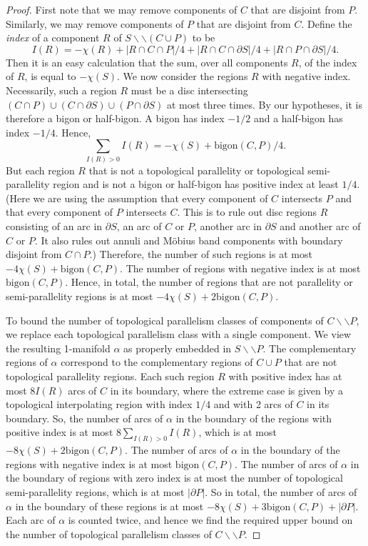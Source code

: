 \documentclass[oneside]{amsart}
\numberwithin{equation}{section}
\theoremstyle{plain}
\theoremstyle{definition}
\newcommand{\cut}{\backslash\backslash}
\begin{document}
\begin{proof}
First note that we may remove components of $C$ that are disjoint from $P$. Similarly, we may remove components of $P$ that are disjoint from $C$.
Define the \emph{index} of a component $R$ of $S \cut (C \cup P)$ to be 
$$I(R) = -\chi(R) + |R \cap C \cap P|/4 + |R \cap C \cap \partial S|/4 + |R \cap P \cap \partial S|/4.$$ 
Then it is an easy calculation that the sum, over all components $R$, of the index of $R$, is equal to $-\chi(S)$. We now consider the regions $R$ with negative index. Necessarily, such a region $R$ must be a disc intersecting $(C \cap P) \cup (C \cap \partial S) \cup (P \cap \partial S)$ at most three times. By our hypotheses, it is therefore a  bigon or half-bigon. A bigon has index $-1/2$ and a half-bigon has index $-1/4$. Hence,
$$\sum_{I(R) > 0} I(R) = - \chi(S) + \mathrm{bigon}(C,P)/4.$$
But each region $R$ that is not a topological parallelity or topological semi-parallelity region and is not a bigon or half-bigon has positive index at least $1/4$. (Here we are using the assumption that every component of $C$ intersects $P$ and that every component of $P$ intersects $C$. This is to rule out disc regions $R$ consisting of an arc in $\partial S$, an arc of $C$ or $P$, another arc in $\partial S$ and another arc of $C$ or $P$. It also rules out annuli and M\"obius band components with boundary disjoint from $C \cap P$.) Therefore, the number of such regions is at most $-4\chi(S) + \mathrm{bigon}(C,P)$. The number of regions with negative index is at most $\mathrm{bigon}(C,P)$. Hence, in total, the number of regions that are not parallelity or semi-parallelity regions is at most $-4 \chi(S) + 2 \mathrm{bigon}(C,P)$.

To bound the number of topological parallelism classes of components of $C \cut P$, we replace each topological parallelism class with a single component. We view the resulting 1-manifold $\alpha$ as properly embedded in $S \cut P$. The complementary regions of $\alpha$ correspond to the complementary regions of $C \cup P$ that are not topological parallelity regions. Each such region $R$ with positive index has at most $8 I(R)$ arcs of $C$ in its boundary, where the extreme case is given by a topological interpolating region with index $1/4$ and with 2 arcs of $C$ in its boundary. So, the number of arcs of $\alpha$ in the boundary of the regions with positive index is at most $8 \sum_{I(R) > 0} I(R)$, which is at most $- 8\chi(S) + 2 \mathrm{bigon}(C,P)$. The number of arcs of $\alpha$ in the boundary of the regions with negative index is at most $\mathrm{bigon}(C,P)$. The number of arcs of $\alpha$ in the boundary of regions with zero index is at most the number of topological semi-parallelity regions, which is at most $|\partial P|$. So in total, the number of arcs of $\alpha$ in the boundary of these regions is at most $- 8\chi(S) + 3 \mathrm{bigon}(C,P) + |\partial P|$. Each arc of $\alpha$ is counted twice, and hence we find the required upper bound on the number of topological parallelism classes of $C \cut P$.
\end{proof}
\end{document}
